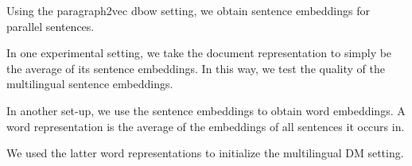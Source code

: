 
Using the paragraph2vec dbow setting, we obtain sentence embeddings for parallel sentences. 

In one experimental setting, we take the document representation to simply be the average of its sentence embeddings. In this way, we test the quality of the multilingual sentence embeddings.

In another set-up, we use the sentence embeddings to obtain word embeddings. A word representation is the average of the embeddings of all sentences it occurs in. 

We used the latter word representations to initialize the multilingual DM setting.